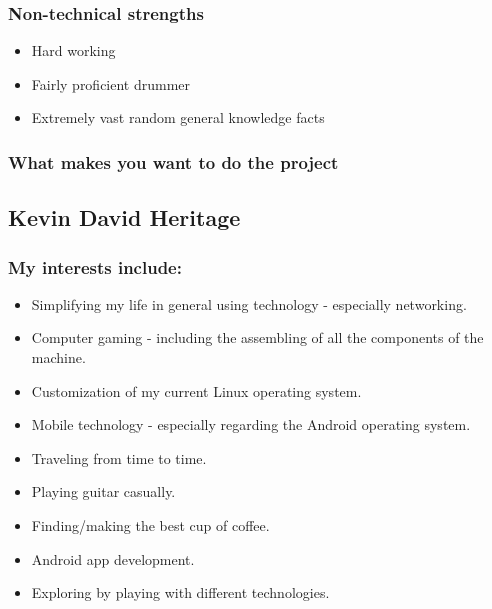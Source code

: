 \documentclass{article}
\begin{document}
	\subsubsection{Non-technical strengths}
	\begin{itemize}
		\item Hard working
		\item Fairly proficient drummer
		\item Extremely vast random general knowledge facts
	\end{itemize}
	\subsubsection{What makes you want to do the project}
	
	\subsection{Kevin David Heritage}
	\subsubsection{My interests include: }
	\begin{itemize}
		\item Simplifying my life in general using technology - especially networking.
		\item Computer gaming - including the assembling of all the components of the machine.
		\item Customization of my current Linux operating system.
		\item Mobile technology - especially regarding the Android operating system.
		\item Traveling from time to time.
		\item Playing guitar casually.
		\item Finding/making the best cup of coffee.
		\item Android app development.
		\item Exploring by playing with different technologies.
	\end{itemize}
\end{document}
